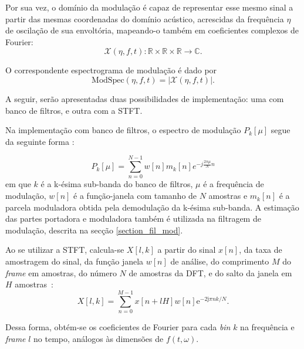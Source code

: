 Por sua vez, o domínio da modulação é capaz de representar esse mesmo sinal a
partir das mesmas coordenadas do domínio acústico, acrescidas da frequência
$\eta$ de oscilação de sua envoltória, mapeando-o também em coeficientes
complexos de Fourier:
\begin{equation}
\mathcal{X}(\eta, f, t): \mathbb{R}  \times \mathbb{R}  \times  \mathbb{R} \rightarrow \mathbb{C}.
\end{equation}

O correspondente espectrograma de modulação é dado por
\begin{equation}
      \mathrm{Mod Spec}(\eta, f, t) = \left\lvert \mathcal{X}(\eta, f, t)\right\rvert.
\end{equation}

A seguir, serão apresentadas duas possibilidades de implementação: uma com banco
de filtros, e outra com a STFT.

Na implementação com banco de filtros, o espectro de modulação $P_k[\mu]$ segue da
seguinte forma \cite{toolbox2010}:

\begin{equation} \label{modspec_filterbank}
    P_k[\mu] = \sum_{n = 0}^{N - 1} w[n]m_k[n] e^{-j \frac{2 \pi \mu}{N} n}
\end{equation}
em que $k$ é a k-ésima sub-banda do banco de filtros, $\mu$ é a frequência de
modulação, $w[n]$ é a função-janela com tamanho de $N$ amostras e $m_k[n]$ é a
parcela moduladora obtida pela demodulação da k-ésima sub-banda. A estimação das
partes portadora e moduladora também é utilizada na filtragem de modulação,
descrita na secção \ref{section_fil_mod}.

Ao se utilizar a STFT, calcula-se $X[l,k]$ a partir do sinal $x[n]$, da taxa de
amostragem do sinal, da função janela $w[n]$ de análise, do comprimento $M$ do
\textit{frame} em amostras, do número $N$ de amostras da DFT, e do salto da janela
em $H$ amostras~\cite{paliwal2015,mauricio}:
 \begin{equation}  \label{stft}
      X[l, k] = \sum_{n = 0}^{M-1} x[n + l H] w[n]{\mathrm{e}^{-2\mathrm{j}\pi n k/N}}. 
 \end{equation}
 
Dessa forma, obtém-se os coeficientes de Fourier para cada \textit{bin} $k$ na
 frequência e \textit{frame} $l$ no tempo, análogos às dimensões de
 $f(t,\omega)$.

